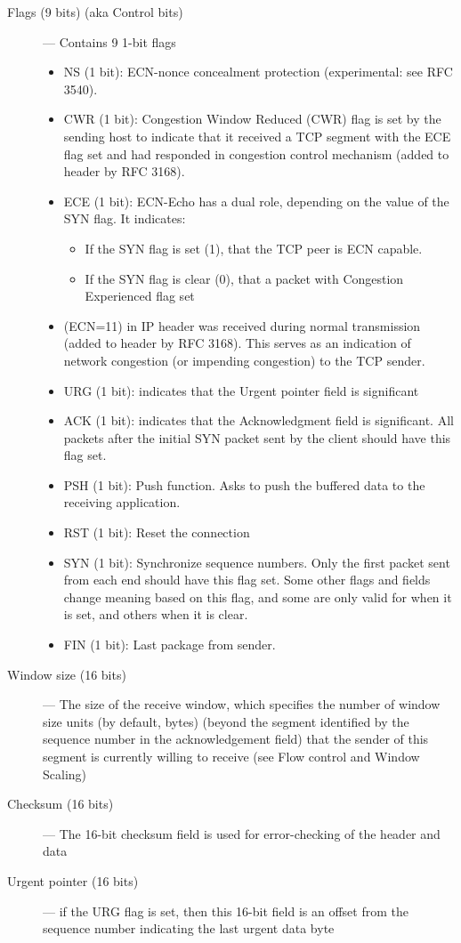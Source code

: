 \documentclass[12pt]{article}
\theoremstyle{definition}
\begin{document}
\begin{description}
				\item [Flags (9 bits) (aka Control bits)] ---
				Contains 9 1-bit flags
				\begin{itemize}
					\item NS (1 bit): ECN-nonce concealment protection (experimental: see RFC 3540).
					\item CWR (1 bit): Congestion Window Reduced (CWR) flag is set by the sending host to indicate that it received a TCP segment with the ECE flag set and had responded in congestion control mechanism (added to header by RFC 3168).
					\item ECE (1 bit): ECN-Echo has a dual role, depending on the value of the SYN flag. It indicates:
					\begin{itemize}
						\item If the SYN flag is set (1), that the TCP peer is ECN capable.
						\item If the SYN flag is clear (0), that a packet with Congestion Experienced flag set 
					\end{itemize}
				
					\item (ECN=11) in IP header was received during normal transmission (added to header by RFC 3168). This serves as an indication of network congestion (or impending congestion) to the TCP sender.
					
					\item URG (1 bit): indicates that the Urgent pointer field is significant
					\item ACK (1 bit): indicates that the Acknowledgment field is significant. All packets after the initial SYN packet sent by the client should have this flag set.
					\item PSH (1 bit): Push function. Asks to push the buffered data to the receiving application.
					\item RST (1 bit): Reset the connection
					\item SYN (1 bit): Synchronize sequence numbers. Only the first packet sent from each end should have this flag set. Some other flags and fields change meaning based on this flag, and some are only valid for when it is set, and others when it is clear.
					\item FIN (1 bit): Last package from sender.
				\end{itemize}
				
				\item [Window size (16 bits)] ---
				The size of the receive window, which specifies the number of window size units (by default, bytes) (beyond the segment identified by the sequence number in the acknowledgement field) that the sender of this segment is currently willing to receive (see Flow control and Window Scaling)
				\item [Checksum (16 bits)] ---
				The 16-bit checksum field is used for error-checking of the header and data
				\item [Urgent pointer (16 bits)] ---
				if the URG flag is set, then this 16-bit field is an offset from the sequence number indicating the last urgent data byte
				
			\end{description}
			
\end{document}
